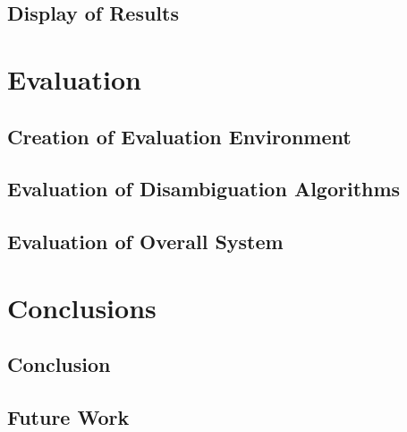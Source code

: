 \documentclass[12pt, a4paper]{report}
\begin{document}
\section{Display of Results}



\chapter{Evaluation}

\section{Creation of Evaluation Environment}

\section{Evaluation of Disambiguation Algorithms}


\section{Evaluation of Overall System}


\chapter{Conclusions}

\section{Conclusion}

\section{Future Work}




\end{document}
